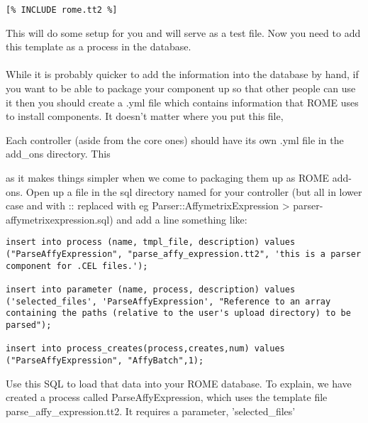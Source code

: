 \begin{verbatim}
[% INCLUDE rome.tt2 %]
\end{verbatim}

This will do some setup for you and will serve as a test file. Now you need to add this template as a process in the database. 

\paragraph*{}
While it is probably quicker to add the information into the database by hand, if you want to be able to package your component up so that other people can use it then you should create a .yml file which contains information that ROME uses to install components. It doesn't matter where you put this file, 

Each controller (aside from the core ones) should have its own .yml file in the add\_ons directory. This 

 as it makes things simpler when we come to packaging them up as ROME add-ons. Open up a file in the sql directory named for your controller (but all in lower case and with :: replaced with \- eg Parser::AffymetrixExpression \-> parser-affymetrixexpression.sql) and add a line something like:

\begin{verbatim}
insert into process (name, tmpl_file, description) values ("ParseAffyExpression", "parse_affy_expression.tt2", 'this is a parser component for .CEL files.');

insert into parameter (name, process, description) values ('selected_files', 'ParseAffyExpression', "Reference to an array containing the paths (relative to the user's upload directory) to be parsed");

insert into process_creates(process,creates,num) values ("ParseAffyExpression", "AffyBatch",1);
\end{verbatim}

Use this SQL to load that data into your ROME database. To explain, we have created a process called ParseAffyExpression, which uses the template file parse\_affy\_expression.tt2. It requires a parameter, 'selected\_files' 









